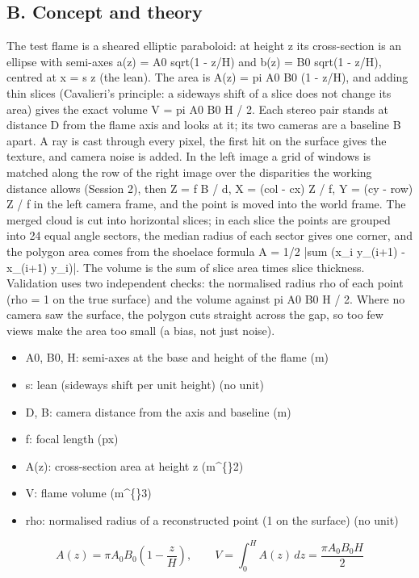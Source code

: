 \documentclass[11pt,a4paper]{article}
\begin{document}
\subsection*{B. Concept and theory}
The test flame is a sheared elliptic paraboloid: at height z its cross-section is an ellipse with semi-axes a(z) = A0 sqrt(1 - z/H) and b(z) = B0 sqrt(1 - z/H), centred at x = s z (the lean). The area is A(z) = pi A0 B0 (1 - z/H), and adding thin slices (Cavalieri's principle: a sideways shift of a slice does not change its area) gives the exact volume V = pi A0 B0 H / 2. Each stereo pair stands at distance D from the flame axis and looks at it; its two cameras are a baseline B apart. A ray is cast through every pixel, the first hit on the surface gives the texture, and camera noise is added. In the left image a grid of windows is matched along the row of the right image over the disparities the working distance allows (Session 2), then Z = f B / d, X = (col - cx) Z / f, Y = (cy - row) Z / f in the left camera frame, and the point is moved into the world frame. The merged cloud is cut into horizontal slices; in each slice the points are grouped into 24 equal angle sectors, the median radius of each sector gives one corner, and the polygon area comes from the shoelace formula A = 1/2 |sum (x\_i y\_(i+1) - x\_(i+1) y\_i)|. The volume is the sum of slice area times slice thickness. Validation uses two independent checks: the normalised radius rho of each point (rho = 1 on the true surface) and the volume against pi A0 B0 H / 2. Where no camera saw the surface, the polygon cuts straight across the gap, so too few views make the area too small (a bias, not just noise).

\begin{itemize}[nosep]
\item A0, B0, H: semi-axes at the base and height of the flame (m)
\item s: lean (sideways shift per unit height) (no unit)
\item D, B: camera distance from the axis and baseline (m)
\item f: focal length (px)
\item A(z): cross-section area at height z (m\textasciicircum\{\}2)
\item V: flame volume (m\textasciicircum\{\}3)
\item rho: normalised radius of a reconstructed point (1 on the surface) (no unit)
\end{itemize}

\begin{equation*}
A(z) = \pi A_0 B_0\left(1-\frac{z}{H}\right),\qquad V=\int_0^H A(z)\,dz=\frac{\pi A_0 B_0 H}{2}
\end{equation*}
\end{document}
